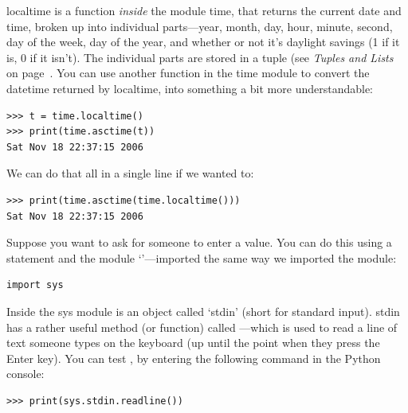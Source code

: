 localtime is a function \emph{inside} the module time, that returns the current date and time, broken up into individual parts---year, month, day, hour, minute, second, day of the week, day of the year, and whether or not it's daylight savings (1 if it is, 0 if it isn't).  The individual parts are stored in a tuple (see \emph{Tuples and Lists} on page~\pageref{tuplesandlists}.  You can use another function in the time module to convert the datetime returned by localtime, into something a bit more understandable:

\begin{listingignore}
\begin{verbatim}
>>> t = time.localtime()
>>> print(time.asctime(t))
Sat Nov 18 22:37:15 2006
\end{verbatim}
\end{listingignore}

\noindent
We can do that all in a single line if we wanted to:

\begin{listingignore}
\begin{verbatim}
>>> print(time.asctime(time.localtime()))
Sat Nov 18 22:37:15 2006
\end{verbatim}
\end{listingignore}

Suppose you want to ask for someone to enter a value. You can do this using a  statement and the module `'---imported the same way we imported the  module:

\begin{listing}
\begin{verbatim}
import sys
\end{verbatim}
\end{listing}

Inside the sys module is an object called `stdin' (short for standard input).  stdin has a rather useful method (or function) called ---which is used to read a line of text someone types on the keyboard (up until the point when they press the Enter key).  You can test , by entering the following command in the Python console:

\begin{listing}
\begin{verbatim}
>>> print(sys.stdin.readline())
\end{verbatim}
\end{listing}

